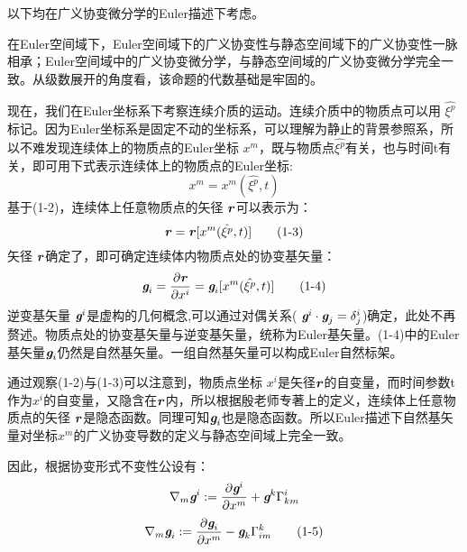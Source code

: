 \documentclass[UTF8]{ctexart}
\begin{document}
以下均在广义协变微分学的Euler描述下考虑。\par
在Euler空间域下，Euler空间域下的广义协变性与静态空间域下的广义协变性一脉相承；Euler空间域中的广义协变微分学，与静态空间域的广义协变微分学完全一致。从级数展开的角度看，该命题的代数基础是牢固的。\par
现在，我们在Euler坐标系下考察连续介质的运动。连续介质中的物质点可以用 $\hat{\xi^p}$标记。因为Euler坐标系是固定不动的坐标系，可以理解为静止的背景参照系，所以不难发现连续体上的物质点的Euler坐标 $x^m$，既与物质点$\hat{\xi^p}$有关，也与时间t有关，即可用下式表示连续体上的物质点的Euler坐标:
\begin{equation*}
    x^m=x^m(\hat{\xi^p},t)\tag{1-2}
\end{equation*}
基于(1-2)，连续体上任意物质点的矢径 $\textbf{\textit{r}}$可以表示为：
\begin{equation*}
    \textbf{\textit{r}}=\textbf{\textit{r}}[x^m(\hat{\xi^p},t)]\tag{1-3}
\end{equation*}
矢径 $\textbf{\textit{r}}$确定了，即可确定连续体内物质点处的协变基矢量：
\begin{equation*}
    \textit{\textbf{g}}_i=\frac{\partial\textbf{\textit{r}}}{\partial x^i}=\textit{\textbf{g}}_i[x^m(\hat{\xi^p},t)]\tag{1-4}
\end{equation*}
逆变基矢量 $\textit{\textbf{g}}^i$是虚构的几何概念,可以通过对偶关系( $\textit{\textbf{g}}^i\cdot \textit{\textbf{g}}_j=\delta^i_j$)确定，此处不再赘述。物质点处的协变基矢量与逆变基矢量，统称为Euler基矢量。(1-4)中的Euler基矢量$\textit{\textbf{g}}_i$仍然是自然基矢量。一组自然基矢量可以构成Euler自然标架。\par
通过观察(1-2)与(1-3)可以注意到，物质点坐标 $x^i$是矢径$\textbf{\textit{r}}$的自变量，而时间参数t作为$x^i$的自变量，又隐含在$\textbf{\textit{r}}$内，所以根据殷老师专著上的定义，连续体上任意物质点的矢径 $\textbf{\textit{r}}$是隐态函数。同理可知$\textit{\textbf{g}}_i$也是隐态函数。所以Euler描述下自然基矢量对坐标$x^m$的广义协变导数的定义与静态空间域上完全一致。\par
因此，根据协变形式不变性公设有：
\begin{equation*}
    \nabla_m\textit{\textbf{g}}^i := \frac{\partial \textit{\textbf{g}}^i}{\partial x^m}+\textit{\textbf{g}}^k\Gamma_{km}^{i}
\end{equation*}
\begin{equation*}
    \nabla_m\textit{\textbf{g}}_i := \frac{\partial \textit{\textbf{g}}_i}{\partial x^m}-\textit{\textbf{g}}_k\Gamma_{im}^{k}
    \tag{1-5}
\end{equation*}
\end{document}
